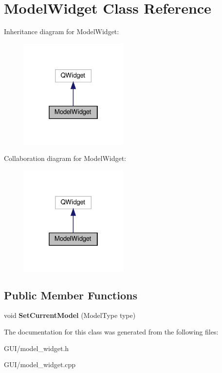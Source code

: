 \hypertarget{classModelWidget}{}\section{Model\+Widget Class Reference}
\label{classModelWidget}


Inheritance diagram for Model\+Widget\+:
\nopagebreak
\begin{figure}[H]
\begin{center}
\leavevmode
\includegraphics[width=154pt]{classModelWidget__inherit__graph}
\end{center}
\end{figure}


Collaboration diagram for Model\+Widget\+:
\nopagebreak
\begin{figure}[H]
\begin{center}
\leavevmode
\includegraphics[width=154pt]{classModelWidget__coll__graph}
\end{center}
\end{figure}
\subsection*{Public Member Functions}
\begin{DoxyCompactItemize}
\item 
\mbox{\label{classModelWidget_a8f68ed6c550a5c4b9839ca6c5c77aa42}} 
void {\bfseries Set\+Current\+Model} (Model\+Type type)
\end{DoxyCompactItemize}


The documentation for this class was generated from the following files\+:\begin{DoxyCompactItemize}
\item 
G\+U\+I/model\+\_\+widget.\+h\item 
G\+U\+I/model\+\_\+widget.\+cpp\end{DoxyCompactItemize}
